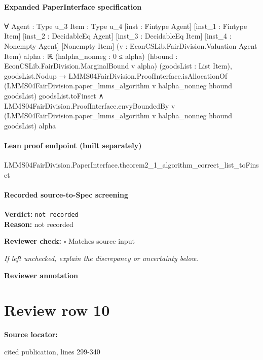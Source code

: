 \documentclass[10pt]{article}
\newcommand{\reviewerbox}{%
  \par\noindent\fbox{\parbox{0.96\linewidth}{\rule{0pt}{0.38in}}}\par
}
\newcommand{\reviewmatch}[1]{%
  \par\noindent\textbf{Reviewer check:} $\square$\; #1\par
  \noindent\emph{If left unchecked, explain the discrepancy or uncertainty below.}\par
}
\begin{document}
\paragraph{Expanded PaperInterface specification}
\begin{ReviewVerbatim}
∀ {Agent : Type u_3} {Item : Type u_4} [inst : Fintype Agent] [inst_1 : Fintype Item] [inst_2 : DecidableEq Agent]
  [inst_3 : DecidableEq Item] [inst_4 : Nonempty Agent] [Nonempty Item]
  (v : EconCSLib.FairDivision.Valuation Agent Item) {alpha : ℝ} (halpha_nonneg : 0 ≤ alpha)
  (hbound : EconCSLib.FairDivision.MarginalBound v alpha) (goodsList : List Item),
  goodsList.Nodup →
    LMMS04FairDivision.ProofInterface.isAllocationOf
        (LMMS04FairDivision.paper_lmms_algorithm v halpha_nonneg hbound goodsList) goodsList.toFinset ∧
      LMMS04FairDivision.ProofInterface.envyBoundedBy v
        (LMMS04FairDivision.paper_lmms_algorithm v halpha_nonneg hbound goodsList) alpha
\end{ReviewVerbatim}

\paragraph{Lean proof endpoint (built separately)}\begin{ReviewVerbatim}
LMMS04FairDivision.PaperInterface.theorem2_1_algorithm_correct_list_toFinset
\end{ReviewVerbatim}

\paragraph{Recorded source-to-Spec screening}
\textbf{Verdict:} \texttt{not recorded}
\\
\textbf{Reason:} not recorded
\reviewmatch{Matches source input}
\noindent\textbf{Reviewer annotation}\par
\reviewerbox
\clearpage
\hypertarget{source-claim-488983f780b608da}{}
\section*{Review row 10}
\textbf{Source locator:} {\footnotesize\raggedright cited publication, lines 299-\allowbreak{}340\par}
\end{document}
